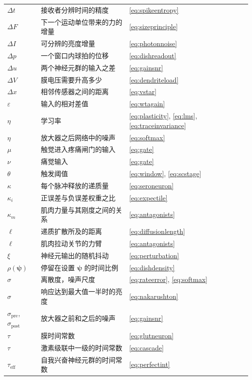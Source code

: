 \begin{center}
\begin{longtable}{>{\raggedright}p{2.0cm}>{\raggedright}p{9.6cm}>{\raggedright\arraybackslash}p{2.4cm}}
$\Delta t$ & 接收者分辨时间的精度 & \eqref{eq:spikeentropy} \\
$\Delta F$ & 下一个运动单位带来的力的增量 & \eqref{eq:sizeprinciple} \\
$\Delta I$ & 可分辨的亮度增量 & \eqref{eq:photonnoise} \\
$\Delta p$ & 一个窗口内球拍的位移 & \eqref{eq:dishreadout} \\
$\Delta u$ & 两个神经元群的输入之差 & \eqref{eq:gainsnr} \\
$\Delta V$ & 膜电压需要升高多少 & \eqref{eq:dendriteload} \\
$\Delta x$ & 相邻传感器之间的距离 & \eqref{eq:vstar} \\
$\varepsilon$ & 输入的相对差值 & \eqref{eq:wtagain} \\
$\eta$ & 学习率 & \eqref{eq:plasticity}, \eqref{eq:lms}, \eqref{eq:traceinvariance} \\
$\eta$ & 放大器之后网络中的噪声 & \eqref{eq:softmax} \\
$\mu$ & 触觉进入疼痛闸门的输入 & \eqref{eq:gate} \\
$\nu$ & 痛觉输入 & \eqref{eq:gate} \\
$\theta$ & 触发阈值 & \eqref{eq:window}, \eqref{eq:scstage} \\
$\kappa$ & 每个脉冲释放的递质量 & \eqref{eq:seroneuron} \\
$\kappa_i$ & 正误差与负误差权重之比 & \eqref{eq:expectile} \\
$\kappa_m$ & 肌肉力量与其刚度之间的关系 & \eqref{eq:antagonists} \\
$\ell$ & 递质扩散所及的距离 & \eqref{eq:diffusionlength} \\
$\ell$ & 肌肉拉动关节的力臂 & \eqref{eq:antagonists} \\
$\xi$ & 神经元输出的随机抖动 & \eqref{eq:perturbation} \\
$\rho(\boldsymbol\psi)$ & 停留在设置 $\boldsymbol\psi$ 的时间比例 & \eqref{eq:dishdensity} \\
$\sigma$ & 离散度，噪声尺度 & \eqref{eq:rateerror}, \eqref{eq:softmax} \\
$\sigma$ & 响应达到最大值一半时的亮度 & \eqref{eq:nakarushton} \\
$\sigma_{\text{pre}}$, $\sigma_{\text{post}}$ & 放大器之前和之后的噪声 & \eqref{eq:gainsnr} \\
$\tau$ & 膜时间常数 & \eqref{eq:glutneuron} \\
$\tau$ & 激素级联中一级的时间常数 & \eqref{eq:cascade} \\
$\tau_{\text{eff}}$ & 自我兴奋神经元群的时间常数 & \eqref{eq:perfectint} \\

\end{longtable}
\end{center}
